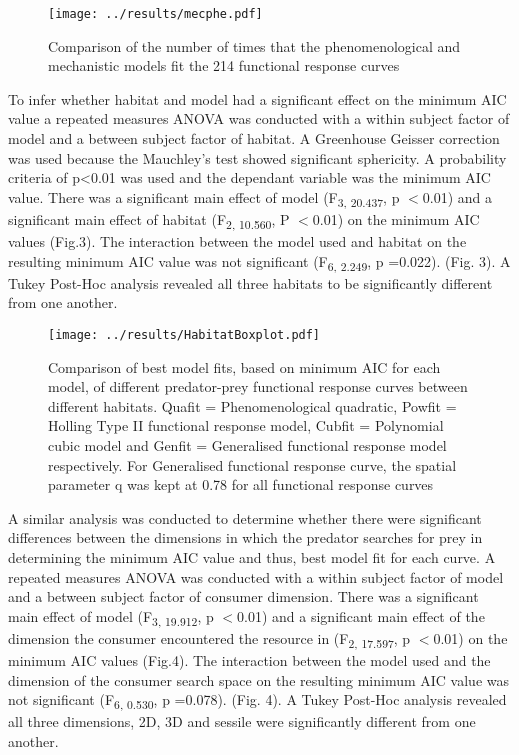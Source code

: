 \documentclass[11pt]{article}
\begin{document}
\begin{figure}[h!]
	
	\texttt{[image: ../results/mecphe.pdf]}
	\caption{Comparison of the number of times that the phenomenological and mechanistic models fit the 214 functional response curves}
	\label{Model Type comparison}
	
\end{figure}

To infer whether habitat and model had a significant effect on the minimum AIC value a repeated measures ANOVA was conducted with a within subject factor of model and a between subject factor of habitat. A Greenhouse Geisser correction was used because the Mauchley's test showed significant sphericity. A probability criteria of p<0.01 was used and the dependant variable was the minimum AIC value. There was a significant main effect of model (F\textsubscript{3, 20.437}, p $<$0.01) and a significant main effect of habitat (F\textsubscript{2, 10.560}, P $<$0.01) on the minimum AIC values (Fig.3). The interaction between the model used and habitat on the resulting minimum AIC value was not significant (F\textsubscript{6, 2.249}, p =0.022).  (Fig. 3). \newline A Tukey Post-Hoc analysis revealed all three habitats to be significantly different from one another. 

\begin{figure}[h!]
	\centering 
	\texttt{[image: ../results/HabitatBoxplot.pdf]}
	\caption{Comparison of best model fits, based on minimum AIC for each model, of different predator-prey functional response curves between different habitats. Quafit = Phenomenological quadratic, Powfit = Holling Type II functional response model, Cubfit = Polynomial cubic model and Genfit = Generalised functional response model respectively. For Generalised functional response curve, the spatial parameter q was kept at 0.78 for all functional response curves }
	\label{Habitat Boxplot of model types}
\end{figure}

A similar analysis was conducted to determine whether there were significant differences between the dimensions in which the predator searches for prey in determining the minimum AIC value and thus, best model fit for each curve. A repeated measures ANOVA was conducted with a within subject factor of model and a between subject factor of consumer dimension. There was a significant main effect of model (F\textsubscript{3, 19.912}, p $<$0.01) and a significant main effect of the dimension the consumer encountered the resource in (F\textsubscript{2, 17.597}, p $<$0.01) on the minimum AIC values (Fig.4). The interaction between the model used and the dimension of the consumer search space on the resulting minimum AIC value was not significant (F\textsubscript{6, 0.530}, p =0.078).  (Fig. 4). \newline A Tukey Post-Hoc analysis revealed all three dimensions, 2D, 3D and sessile were significantly different from one another. 
\end{document}
